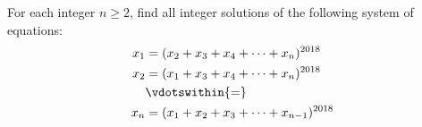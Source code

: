 For each integer $n \geq 2$,  find all integer solutions of the following system of equations:\begin{align*}

x_1 &= (x_2 + x_3 + x_4 + \dots + x_n)^{2018} \\

x_2 &= (x_1 + x_3 + x_4 + \dots + x_n)^{2018} \\

& \vdotswithin{ = } \\

x_n &= (x_1 + x_2 + x_3 + \dots + x_{n - 1})^{2018}

\end{align*}